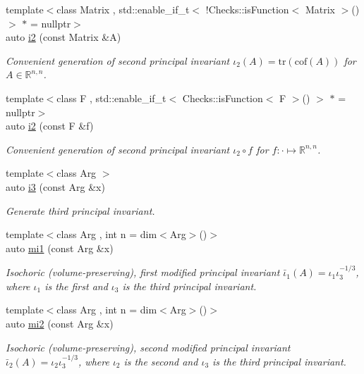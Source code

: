 \begin{DoxyCompactItemize}
{\footnotesize template$<$class Matrix , std\+::enable\+\_\+if\+\_\+t$<$ !\+Checks\+::is\+Function$<$ Matrix $>$() $>$ $\ast$  = nullptr$>$ }\\auto \hyperlink{group__InvariantGroup_ga9e442bab8f203bcd5634a3d0e65bf802}{i2} (const Matrix \&A)
\begin{DoxyCompactList}\small\item\em Convenient generation of second principal invariant $ \iota_2(A)=\mathrm{tr}(\mathrm{cof}(A)) $ for $A\in\mathbb{R}^{n,n}$. \end{DoxyCompactList}\item 
{\footnotesize template$<$class F , std\+::enable\+\_\+if\+\_\+t$<$ Checks\+::is\+Function$<$ F $>$() $>$ $\ast$  = nullptr$>$ }\\auto \hyperlink{group__InvariantGroup_gad3987f97353c8696e602ed1915b3cf47}{i2} (const F \&f)
\begin{DoxyCompactList}\small\item\em Convenient generation of second principal invariant $ \iota_2\circ f $ for $f:\cdot\mapsto\mathbb{R}^{n,n}$. \end{DoxyCompactList}\item 
{\footnotesize template$<$class Arg $>$ }\\auto \hyperlink{group__InvariantGroup_gae1ad80b4b2f34a10564114fad28bc313}{i3} (const Arg \&x)
\begin{DoxyCompactList}\small\item\em Generate third principal invariant. \end{DoxyCompactList}\item 
{\footnotesize template$<$class Arg , int n = dim$<$\+Arg$>$()$>$ }\\auto \hyperlink{group__InvariantGroup_ga7eed5e2661171d81e192ac1db791244c}{mi1} (const Arg \&x)
\begin{DoxyCompactList}\small\item\em Isochoric (volume-\/preserving), first modified principal invariant $ \bar\iota_1(A)=\iota_1\iota_3^{-1/3} $, where $\iota_1$ is the first and $\iota_3$ is the third principal invariant. \end{DoxyCompactList}\item 
{\footnotesize template$<$class Arg , int n = dim$<$\+Arg$>$()$>$ }\\auto \hyperlink{group__InvariantGroup_ga9d219c5c48cce1d3af60345916963524}{mi2} (const Arg \&x)
\begin{DoxyCompactList}\small\item\em Isochoric (volume-\/preserving), second modified principal invariant $ \bar\iota_2(A)=\iota_2\iota_3^{-1/3} $, where $\iota_2$ is the second and $\iota_3$ is the third principal invariant. \end{DoxyCompactList}\item 

\end{DoxyCompactItemize}

